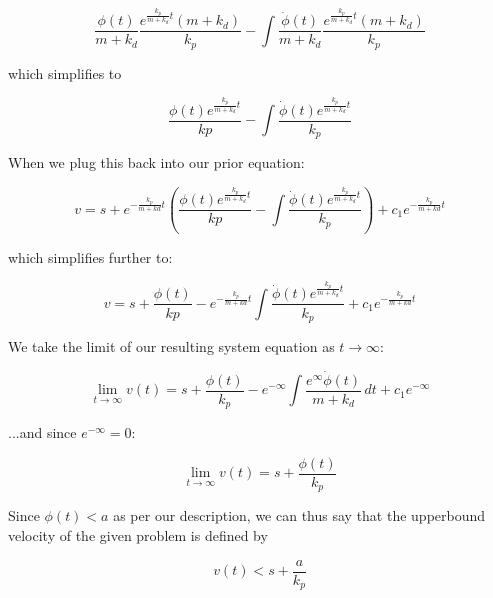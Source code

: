\documentclass{article}
\begin{document}
\[\frac{\phi(t)}{m+k_d} \frac{e^{\frac{k_p}{m+k_d}t}(m+k_d)}{k_p} - \int { \frac{\dot \phi(t)}{m+k_d} \frac{e^{\frac{k_p}{m+k_d}t}(m+k_d)}{k_p}}\]

which simplifies to

\[ \frac{\phi(t) e^{\frac{k_p}{m+k_d}t}}{kp} - \int \frac{\dot \phi(t) e^{\frac{k_p}{m+k_d}t}}{k_p} \]

When we plug this back into our prior equation:

\[v = s + e^{-\frac{k_p}{m+kd}t} (\frac{\phi(t) e^{\frac{k_p}{m+k_d}t}}{kp} - \int \frac{\dot \phi(t) e^{\frac{k_p}{m+k_d}t}}{k_p}) + c_1 e^{-\frac{k_p}{m+kd}t}\]

which simplifies further to:

\[v = s + \frac{\phi(t)}{kp} - e^{-\frac{k_p}{m+kd}t} \int \frac{\dot \phi(t) e^{\frac{k_p}{m+k_d}t}}{k_p} + c_1 e^{-\frac{k_p}{m+kd}t}\]


We take the limit of our resulting system equation as \(t \to \infty\):

\[\lim_{t \to \infty} v(t) = s + \frac{\phi(t)}{k_p} - e^{-\infty} \int \frac{e^{\infty} \dot \phi(t)}{m+k_d} \,dt + c_1 e^{-\infty}\]

...and since \(e^{-\infty} = 0\):

\[\lim_{t \to \infty} v(t) = s + \frac{\phi(t)}{k_p}\]

Since \(\phi(t) < a\) as per our description, we can thus say that the upperbound velocity of the given problem is defined by

\[v(t) < s + \frac{a}{k_p}\]
\end{document}
